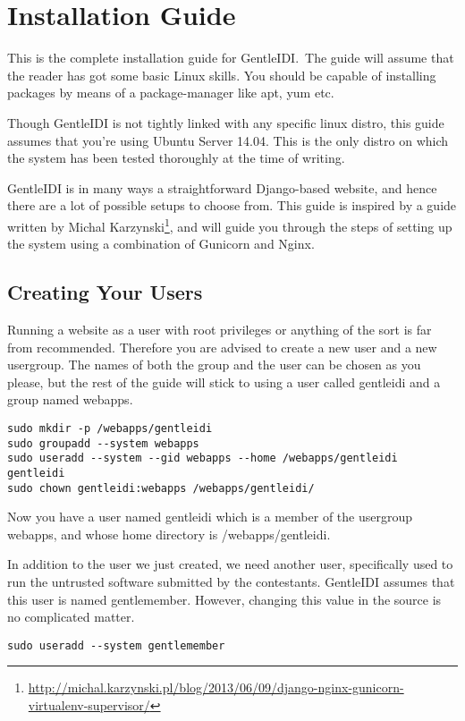 \chapter{Installation Guide}
\label{appendix:install}
This is the complete installation guide for GentleIDI.\ The guide will assume
that the reader has got some basic Linux skills. You should be
capable of installing packages by means of a package-manager like apt,
yum etc.

Though GentleIDI is not tightly linked with any specific linux distro,
this guide assumes that you're using Ubuntu Server
14.04. This is the only distro on which the system has been tested
thoroughly at the time of writing.

GentleIDI is in many ways a straightforward Django-based website, and
hence there are a lot of possible setups to choose from. This guide is
inspired by a guide written by Michal Karzynski\footnote{\url{http://michal.karzynski.pl/blog/2013/06/09/django-nginx-gunicorn-virtualenv-supervisor/}}, and will guide you
through the steps of setting up the system using a combination of
Gunicorn and Nginx.

\section{Creating Your Users}
Running a website as a user with root privileges or anything of the sort
is far from recommended. Therefore you are advised to create a new
user and a new usergroup. The names of both the group and the user can
be chosen as you please, but the rest of the guide will stick to using
a user called gentleidi and a group named webapps.

\begin{verbatim}
sudo mkdir -p /webapps/gentleidi
sudo groupadd --system webapps
sudo useradd --system --gid webapps --home /webapps/gentleidi gentleidi
sudo chown gentleidi:webapps /webapps/gentleidi/
\end{verbatim}

Now you have a user named gentleidi which is a member of the usergroup
webapps, and whose home directory is /webapps/gentleidi.

In addition to the user we just created, we need another user,
specifically used to run the untrusted software submitted by the
contestants. GentleIDI assumes that this user is named gentlemember.
However, changing this value in the source is no complicated matter.

\begin{verbatim}
sudo useradd --system gentlemember
\end{verbatim}

